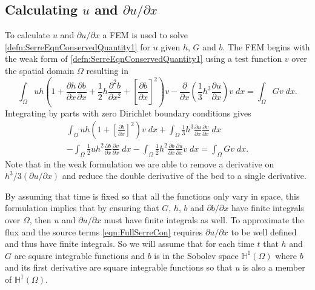 \documentclass[times]{elsarticle}
\begin{document}
\subsection{Calculating $u$ and $\partial u / \partial x$}
To calculate $u$ and $\partial u / \partial x$ a FEM is used to solve \eqref{defn:SerreEqnConservedQuantity1} for $u$ given $h$, $G$ and $b$. The FEM begins with the weak form of \eqref{defn:SerreEqnConservedQuantity1} using a test function $v$ over the spatial domain $\Omega$ resulting in
\begin{equation*}
 \int_{\Omega } uh \left(1 + \frac{\partial h}{\partial x}\frac{\partial b}{\partial x} + \frac{1}{2}h\frac{\partial^2 b}{\partial x^2} +  \left[\frac{\partial b}{\partial x}\right]^2 \right) v - \frac{\partial}{\partial x}\left(\frac{1}{3}h^3  \frac{\partial {u}}{\partial x}\right) v \; dx = \int_{\Omega } G v \; dx.
\end{equation*}
Integrating by parts with zero Dirichlet boundary conditions gives
\begin{multline}
\int_{\Omega } uh \left(1 + \left[\frac{\partial b}{\partial x}\right]^2 \right) v \; dx +  \int_{\Omega } \frac{1}{3}h^3  \frac{\partial {u}}{\partial x} \frac{\partial v}{\partial x} \; dx  \\ -
\int_{\Omega }   \frac{1}{2} u h^2\frac{\partial b}{\partial x}  \frac{\partial v }{\partial x}\; dx -
\int_{\Omega }   \frac{1}{2}h^2\frac{\partial b}{\partial x}  \frac{\partial u }{\partial x}v \; dx = \int_{\Omega } G v \; dx.
\label{eqn:WeakFormDomain}
\end{multline}
Note that in the weak formulation we are able to remove a derivative on $h^3/3\left(\partial u / \partial x\right)$ and reduce the double derivative of the bed to a single derivative.

By assuming that time is fixed so that all the functions only vary in space, this formulation implies that by ensuring that $G$, $h$, $b$ and $\partial b / \partial x$ have finite integrals over $\Omega$, then $u$ and $\partial u / \partial x$ must have finite integrals as well. To approximate the flux and the source terms \eqref{eqn:FullSerreCon} requires $\partial u / \partial x$ to be well defined and thus have finite integrals. So we will assume that for each time $t$ that $h$ and $G$ are square integrable functions and $b$ is in the Sobolev space $\mathbb{H}^{1}(\Omega)$ where $b$ and its first derivative are square integrable functions so that $u$ is also a member of $\mathbb{H}^{1}(\Omega)$.
\end{document}
